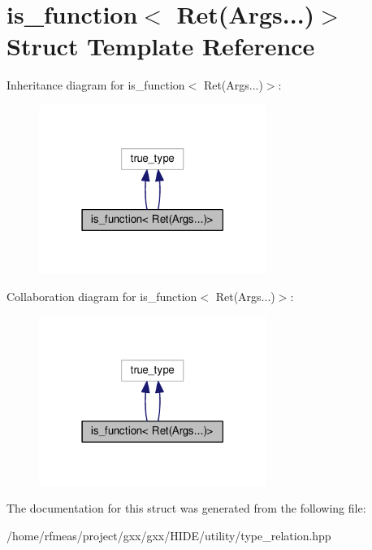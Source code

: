 \hypertarget{structis__function_3_01Ret_07Args_8_8_8_08_4}{}\section{is\+\_\+function$<$ Ret(Args...)$>$ Struct Template Reference}
\label{structis__function_3_01Ret_07Args_8_8_8_08_4}


Inheritance diagram for is\+\_\+function$<$ Ret(Args...)$>$\+:
\nopagebreak
\begin{figure}[H]
\begin{center}
\leavevmode
\includegraphics[width=210pt]{structis__function_3_01Ret_07Args_8_8_8_08_4__inherit__graph}
\end{center}
\end{figure}


Collaboration diagram for is\+\_\+function$<$ Ret(Args...)$>$\+:
\nopagebreak
\begin{figure}[H]
\begin{center}
\leavevmode
\includegraphics[width=210pt]{structis__function_3_01Ret_07Args_8_8_8_08_4__coll__graph}
\end{center}
\end{figure}


The documentation for this struct was generated from the following file\+:\begin{DoxyCompactItemize}
\item 
/home/rfmeas/project/gxx/gxx/\+H\+I\+D\+E/utility/type\+\_\+relation.\+hpp\end{DoxyCompactItemize}
